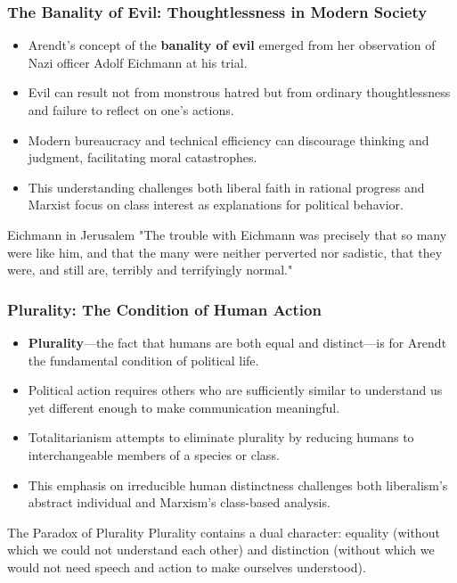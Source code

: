 \documentclass{beamer}
\begin{document}
\begin{frame}
\frametitle{The Banality of Evil: Thoughtlessness in Modern Society}
\begin{itemize}
    \item Arendt's concept of the \textbf{banality of evil} emerged from her observation of Nazi officer Adolf Eichmann at his trial.
    \item Evil can result not from monstrous hatred but from ordinary thoughtlessness and failure to reflect on one's actions.
    \item Modern bureaucracy and technical efficiency can discourage thinking and judgment, facilitating moral catastrophes.
    \item This understanding challenges both liberal faith in rational progress and Marxist focus on class interest as explanations for political behavior.
\end{itemize}

\begin{exampleblock}{Eichmann in Jerusalem}
"The trouble with Eichmann was precisely that so many were like him, and that the many were neither perverted nor sadistic, that they were, and still are, terribly and terrifyingly normal."
\end{exampleblock}
\end{frame}

\begin{frame}
\frametitle{Plurality: The Condition of Human Action}
\begin{itemize}
    \item \textbf{Plurality}—the fact that humans are both equal and distinct—is for Arendt the fundamental condition of political life.
    \item Political action requires others who are sufficiently similar to understand us yet different enough to make communication meaningful.
    \item Totalitarianism attempts to eliminate plurality by reducing humans to interchangeable members of a species or class.
    \item This emphasis on irreducible human distinctness challenges both liberalism's abstract individual and Marxism's class-based analysis.
\end{itemize}

\begin{block}{The Paradox of Plurality}
Plurality contains a dual character: equality (without which we could not understand each other) and distinction (without which we would not need speech and action to make ourselves understood).
\end{block}
\end{frame}
\end{document}
